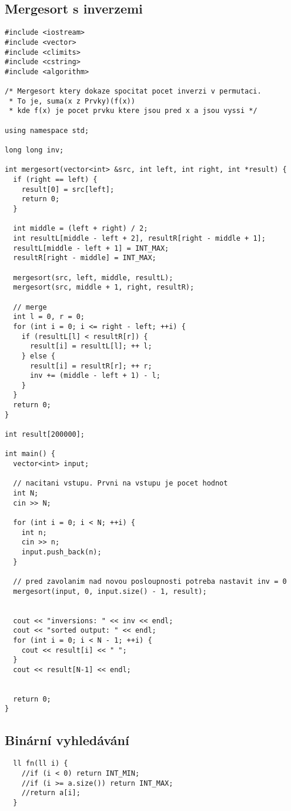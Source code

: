 \documentclass{article}
\begin{document}
\subsection{Mergesort s inverzemi}
\begin{lstlisting}
#include <iostream>
#include <vector>
#include <climits>
#include <cstring>
#include <algorithm>

/* Mergesort ktery dokaze spocitat pocet inverzi v permutaci.
 * To je, suma(x z Prvky)(f(x))
 * kde f(x) je pocet prvku ktere jsou pred x a jsou vyssi */

using namespace std;

long long inv;

int mergesort(vector<int> &src, int left, int right, int *result) {
  if (right == left) {
    result[0] = src[left];
    return 0;
  }

  int middle = (left + right) / 2;
  int resultL[middle - left + 2], resultR[right - middle + 1];
  resultL[middle - left + 1] = INT_MAX;
  resultR[right - middle] = INT_MAX;

  mergesort(src, left, middle, resultL);
  mergesort(src, middle + 1, right, resultR);

  // merge
  int l = 0, r = 0;
  for (int i = 0; i <= right - left; ++i) {
    if (resultL[l] < resultR[r]) {
      result[i] = resultL[l]; ++ l;
    } else {
      result[i] = resultR[r]; ++ r;
      inv += (middle - left + 1) - l;
    }
  }
  return 0;
}

int result[200000];

int main() {
  vector<int> input;

  // nacitani vstupu. Prvni na vstupu je pocet hodnot
  int N;
  cin >> N;

  for (int i = 0; i < N; ++i) {
    int n;
    cin >> n;
    input.push_back(n);
  }

  // pred zavolanim nad novou posloupnosti potreba nastavit inv = 0
  mergesort(input, 0, input.size() - 1, result);


  cout << "inversions: " << inv << endl;
  cout << "sorted output: " << endl;
  for (int i = 0; i < N - 1; ++i) {
    cout << result[i] << " ";
  }
  cout << result[N-1] << endl;


  return 0;
}
\end{lstlisting}

\subsection{Binární vyhledávání}
\begin{lstlisting}
  ll fn(ll i) {
    //if (i < 0) return INT_MIN;
    //if (i >= a.size()) return INT_MAX;
    //return a[i];
  }
\end{lstlisting}
\end{document}
